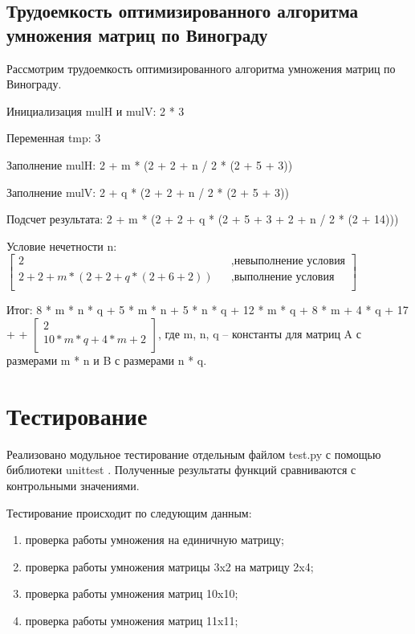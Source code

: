\documentclass[12pt]{report}
\begin{document}
\subsection{Трудоемкость оптимизированного алгоритма умножения матриц по Винограду}
Рассмотрим трудоемкость оптимизированного алгоритма умножения матриц по Винограду.\vspace{\baselineskip}

Инициализация mulH и mulV: 2 * 3\vspace{\baselineskip}

Переменная tmp: 3\vspace{\baselineskip}

Заполнение mulH: 2 + m * (2 + 2 + n / 2 * (2 + 5 + 3))\vspace{\baselineskip}

Заполнение mulV: 2 + q * (2 + 2 + n / 2 * (2 + 5 + 3))\vspace{\baselineskip}

Подсчет результата: 2 + m * (2 + 2 + q * (2 + 5 + 3 + 2 + n / 2 * (2 + 14)))\vspace{\baselineskip}


Условие нечетности n: $\begin{bmatrix}
	2    &&, \text{невыполнение условия}\\
	2 + 2 + m * (2 + 2 + q * (2 + 6 + 2)) &&, \text{выполнение условия}\\
\end{bmatrix} $ \\
\vspace{\baselineskip}

Итог: 8 * m * n * q + 5 * m * n + 5 * n * q + 12 * m * q + 8 * m + 4 * q + 17 + + $\begin{bmatrix}
	2    \\
	10*m*q + 4*m + 2\\
\end{bmatrix} $, где m, n, q – константы для матриц A с размерами m * n и B с размерами n * q.

\newpage
\section{Тестирование}
Реализовано модульное тестирование отдельным файлом test.py с помощью библиотеки unittest \cite{unittest}. Полученные результаты функций сравниваются с контрольными значениями. \vspace{\baselineskip}

Тестирование происходит по следующим данным:
\begin{enumerate}
	\item проверка работы умножения на единичную матрицу;
	\item проверка работы умножения матрицы 3x2 на матрицу 2x4;
	\item проверка работы умножения матриц 10x10;
	\item проверка работы умножения матриц 11x11;
\end{enumerate}
\end{document}
